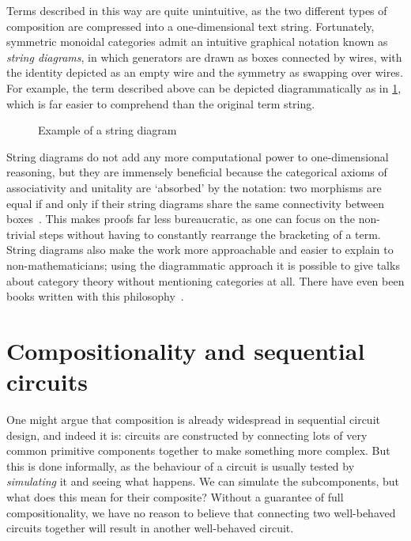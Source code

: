 Terms described in this way are quite unintuitive, as the two different types of
composition are compressed into a one-dimensional text string.
Fortunately, symmetric monoidal categories admit an intuitive graphical notation
known as \emph{string diagrams}, in which generators are drawn as boxes
connected by wires, with the identity depicted as an empty wire and the symmetry
as swapping over wires.
For example, the term described above can be depicted diagrammatically as in
\cref{fig:string}, which is far easier to comprehend than the original term
string.

\begin{figure}
    \centering
    \caption{Example of a string diagram}
    \label{fig:string}
\end{figure}

String diagrams do not add any more computational power to one-dimensional
reasoning, but they are
immensely beneficial because the categorical axioms of associativity and
unitality are `absorbed' by the notation: two morphisms are equal if and only if
their string diagrams share the same connectivity between
boxes~\cite{kelly1980coherence,kissinger2014abstract,selinger2011survey}.
This makes proofs far less bureaucratic, as one can focus on the non-trivial
steps without having to constantly rearrange the bracketing of a term.
String diagrams also make the work more approachable and easier to explain to
non-mathematicians; using the diagrammatic approach it is possible to give talks
about category theory without mentioning categories at all.
There have even been books written with this
philosophy~\cite{coecke2018picturing}.


\section{Compositionality and sequential circuits}

One might argue that composition is already widespread in sequential circuit
design, and indeed it is: circuits are constructed by connecting lots of very
common primitive components together to make something more complex.
But this is done informally, as the behaviour of a circuit is usually tested
by \emph{simulating} it and seeing what happens.
We can simulate the subcomponents, but what does this mean for their composite?
Without a guarantee of full compositionality, we have no reason to
believe that connecting two well-behaved circuits together will result in
another well-behaved circuit.

